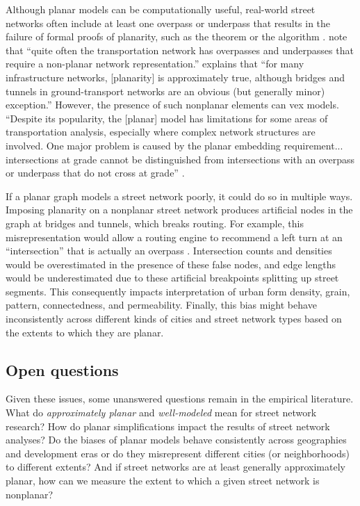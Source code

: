 \documentclass[Afour,sageh,times]{sagej}
\begin{document}
Although planar models can be computationally useful, real-world street networks often include at least one overpass or underpass that results in the failure of formal proofs of planarity, such as the \citet{kuratowski_sur_1930} theorem or the \cite{hopcroft_efficient_1974} algorithm \citep[cf.][]{gastner_spatial_2006,levinson_network_2012}. \citet[p.~199]{jiang_object-oriented_2010} note that \enquote{quite often the transportation network has overpasses and underpasses that require a non-planar network representation.} \citet[p.~1258]{fischer_spatial_2014} explains that \enquote{for many infrastructure networks, {[planarity]} is approximately true, although bridges and tunnels in ground-transport networks are an obvious (but generally minor) exception.} However, the presence of such nonplanar elements can vex models. \enquote{Despite its popularity, the [planar] model has limitations for some areas of transportation analysis, especially where complex network structures are involved. One major problem is caused by the planar embedding requirement... intersections at grade cannot be distinguished from intersections with an overpass or underpass that do not cross at grade} \citep[p.~395]{fischer_gis_2004}.

If a planar graph models a street network poorly, it could do so in multiple ways. Imposing planarity on a nonplanar street network produces artificial nodes in the graph at bridges and tunnels, which breaks routing. For example, this misrepresentation would allow a routing engine to recommend a left turn at an \enquote{intersection} that is actually an overpass \citep[p.~6]{kwan_review_1996}. Intersection counts and densities would be overestimated in the presence of these false nodes, and edge lengths would be underestimated due to these artificial breakpoints splitting up street segments. This consequently impacts interpretation of urban form density, grain, pattern, connectedness, and permeability. Finally, this bias might behave inconsistently across different kinds of cities and street network types based on the extents to which they are planar.

\subsection{Open questions}

Given these issues, some unanswered questions remain in the empirical literature. What do \emph{approximately planar} and \emph{well-modeled} mean for street network research? How do planar simplifications impact the results of street network analyses? Do the biases of planar models behave consistently across geographies and development eras or do they misrepresent different cities (or neighborhoods) to different extents? And if street networks are at least generally approximately planar, how can we measure the extent to which a given street network is nonplanar?
\end{document}
